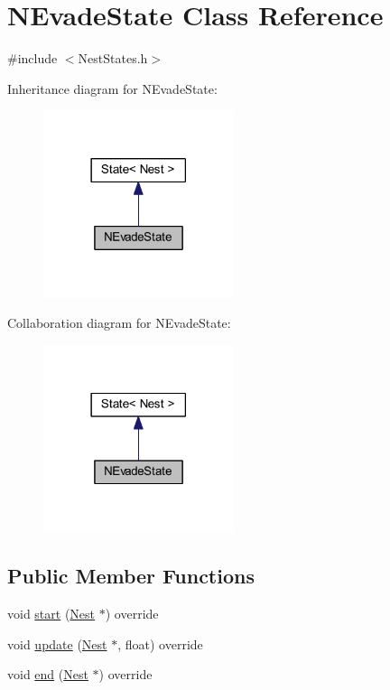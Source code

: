 \hypertarget{class_n_evade_state}{}\section{N\+Evade\+State Class Reference}
\label{class_n_evade_state}


{\ttfamily \#include $<$Nest\+States.\+h$>$}



Inheritance diagram for N\+Evade\+State\+:
\nopagebreak
\begin{figure}[H]
\begin{center}
\leavevmode
\includegraphics[width=158pt]{class_n_evade_state__inherit__graph}
\end{center}
\end{figure}


Collaboration diagram for N\+Evade\+State\+:
\nopagebreak
\begin{figure}[H]
\begin{center}
\leavevmode
\includegraphics[width=158pt]{class_n_evade_state__coll__graph}
\end{center}
\end{figure}
\subsection*{Public Member Functions}
\begin{DoxyCompactItemize}
\item 
void \hyperlink{class_n_evade_state_a4df3fb4c1325d9546ff1f659086d4f38}{start} (\hyperlink{class_nest}{Nest} $\ast$) override
\item 
void \hyperlink{class_n_evade_state_a9f4c58b444e53f79c9be0ebd85bf63a2}{update} (\hyperlink{class_nest}{Nest} $\ast$, float) override
\item 
void \hyperlink{class_n_evade_state_a2bdb23a457b6ef01dee943c0c26da079}{end} (\hyperlink{class_nest}{Nest} $\ast$) override
\end{DoxyCompactItemize}
